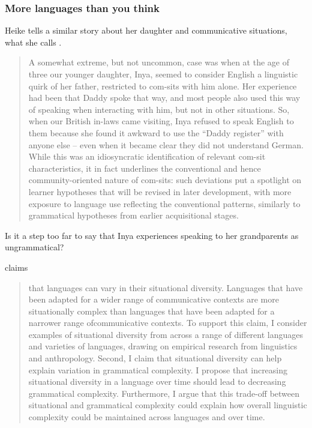 \subsubsection{More languages than you think}

Heike \citet{Wiese2023} tells a similar story about her daughter and communicative situations, what she calls .

\begin{quote}
    A somewhat extreme, but not uncommon, case was when at the age of three our younger daughter, Inya, seemed to consider English a linguistic quirk of her father, restricted to com-sits with him alone. Her experience had been that Daddy spoke that way, and most people also used this way of speaking when interacting with him, but not in other situations. So, when our British in-laws came visiting, Inya refused to speak English to them because she found it awkward to use the ``Daddy register'' with anyone else -- even when it became clear they did not understand German. While this was an idiosyncratic identification of relevant com-sit characteristics, it in fact underlines the conventional and hence community-oriented nature of com-sits: such deviations put a spotlight on learner hypotheses that will be revised in later development, with more exposure to language use reflecting the conventional patterns, similarly to grammatical hypotheses from earlier acquisitional stages. \hfill\citep[42--43]{Wiese2023}
\end{quote}

Is it a step too far to say that Inya experiences speaking to her grandparents as ungrammatical?

\citet{Grieve2023} claims

\begin{quote}
    that languages can vary in their situational diversity. Languages that have been adapted for a wider range of communicative contexts are more situationally complex than languages that have been adapted for a narrower range ofcommunicative contexts. To support this claim, I consider examples of situational diversity from across a range of different languages and varieties of languages, drawing on empirical research from linguistics and anthropology. Second, I claim that situational diversity can help explain variation in grammatical complexity. I propose that increasing situational diversity in a language over time should lead to decreasing grammatical complexity. Furthermore, I argue that this trade-off between situational and grammatical complexity could explain how overall linguistic complexity could be maintained across languages and over time.
\end{quote}

